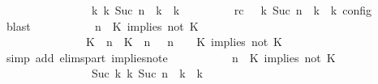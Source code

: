 \begin{isabellebody}
\ \ \ \ \ \ \ \ \ \ \ \ \ \ \ \ {\isasymhookrightarrow}\isactrlbsup k\isactrlesup \ {\isacharparenleft}{\isasymGamma}\isactrlsub k{\isacharcomma}\ Suc\ n\ {\isasymturnstile}\ {\isasymPsi}\isactrlsub k\ {\isasymtriangleright}\ {\isasymPhi}\isactrlsub k{\isacharparenright}{\isacartoucheclose}\isanewline
\ \ \ \ \ \ \ \ \ rc{\isacharcolon}{\isacartoucheopen}{\isasymrho}\ {\isasymin}\ {\isasymlbrakk}\ {\isasymGamma}\isactrlsub k{\isacharcomma}\ Suc\ n\ {\isasymturnstile}\ {\isasymPsi}\isactrlsub k\ {\isasymtriangleright}\ {\isasymPhi}\isactrlsub k\ {\isasymrbrakk}\isactrlsub c\isactrlsub o\isactrlsub n\isactrlsub f\isactrlsub i\isactrlsub g{\isacartoucheclose}\ \isamarkupfalse%
\ blast\isanewline
\ \ \ \ \ \ \ \ \isamarkupfalse%
\ {\isacartoucheopen}{\isacharparenleft}{\isasymGamma}{\isacharcomma}\ n\ {\isasymturnstile}\ {\isacharparenleft}{\isacharparenleft}K\ implies\ not\ K\ {\isacharhash}\ {\isasymPsi}{\isacharparenright}\ {\isasymtriangleright}\ {\isasymPhi}{\isacharparenright}\isanewline
\ \ \ \ \ \ \ \ \ \ \ \ \ \ {\isasymhookrightarrow}\ {\isacharparenleft}{\isacharparenleft}{\isacharparenleft}K\ {\isasymUp}\ n{\isacharparenright}\ {\isacharhash}\ {\isacharparenleft}K\ {\isasymnot}{\isasymUp}\ n{\isacharparenright}\ {\isacharhash}\ {\isasymGamma}{\isacharparenright}{\isacharcomma}\ n\ {\isasymturnstile}\ {\isasymPsi}\ {\isasymtriangleright}\ {\isacharparenleft}{\isacharparenleft}K\ implies\ not\ K\ {\isacharhash}\ {\isasymPhi}{\isacharparenright}{\isacharparenright}{\isacartoucheclose}\isanewline
\ \ \ \ \ \ \ \ \ \ \isamarkupfalse%
\ {\isacharparenleft}simp\ add{\isacharcolon}\ elims{\isacharunderscore}part\ implies{\isacharunderscore}not{\isacharunderscore}e{}{\isacharparenright}\isanewline
\ \ \ \ \ \ \ \ \isamarkupfalse%
\ {\isacartoucheopen}{\isacharparenleft}{\isasymGamma}{\isacharcomma}\ n\ {\isasymturnstile}\ {\isacharparenleft}{\isacharparenleft}K\ implies\ not\ K\ {\isacharhash}\ {\isasymPsi}{\isacharparenright}\ {\isasymtriangleright}\ {\isasymPhi}{\isacharparenright}\isanewline
\ \ \ \ \ \ \ \ \ \ \ \ \ \ \ \ {\isasymhookrightarrow}\isactrlbsup Suc\ k\isactrlesup \ {\isacharparenleft}{\isasymGamma}\isactrlsub k{\isacharcomma}\ Suc\ n\ {\isasymturnstile}\ {\isasymPsi}\isactrlsub k\ {\isasymtriangleright}\ {\isasymPhi}\isactrlsub k{\isacharparenright}{\isacartoucheclose}\isanewline

\end{isabellebody}
